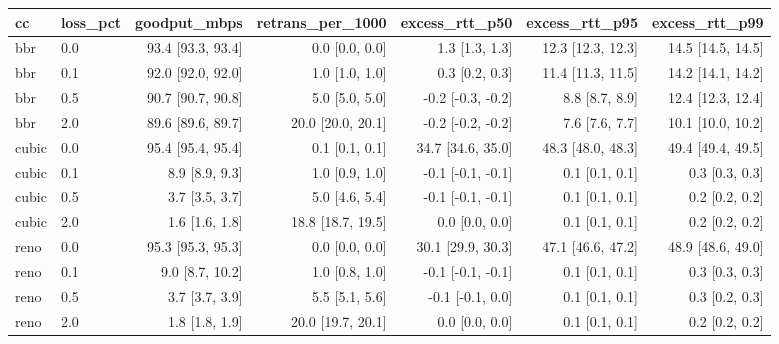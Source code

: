 \begin{tabular}{llrrrrr}
cc & loss_pct & goodput\_mbps & retrans\_per\_1000 & excess\_rtt\_p50 & excess\_rtt\_p95 & excess\_rtt\_p99 \\ \hline
bbr & 0.0 & 93.4 [93.3, 93.4] & 0.0 [0.0, 0.0] & 1.3 [1.3, 1.3] & 12.3 [12.3, 12.3] & 14.5 [14.5, 14.5] \\
bbr & 0.1 & 92.0 [92.0, 92.0] & 1.0 [1.0, 1.0] & 0.3 [0.2, 0.3] & 11.4 [11.3, 11.5] & 14.2 [14.1, 14.2] \\
bbr & 0.5 & 90.7 [90.7, 90.8] & 5.0 [5.0, 5.0] & -0.2 [-0.3, -0.2] & 8.8 [8.7, 8.9] & 12.4 [12.3, 12.4] \\
bbr & 2.0 & 89.6 [89.6, 89.7] & 20.0 [20.0, 20.1] & -0.2 [-0.2, -0.2] & 7.6 [7.6, 7.7] & 10.1 [10.0, 10.2] \\
cubic & 0.0 & 95.4 [95.4, 95.4] & 0.1 [0.1, 0.1] & 34.7 [34.6, 35.0] & 48.3 [48.0, 48.3] & 49.4 [49.4, 49.5] \\
cubic & 0.1 & 8.9 [8.9, 9.3] & 1.0 [0.9, 1.0] & -0.1 [-0.1, -0.1] & 0.1 [0.1, 0.1] & 0.3 [0.3, 0.3] \\
cubic & 0.5 & 3.7 [3.5, 3.7] & 5.0 [4.6, 5.4] & -0.1 [-0.1, -0.1] & 0.1 [0.1, 0.1] & 0.2 [0.2, 0.2] \\
cubic & 2.0 & 1.6 [1.6, 1.8] & 18.8 [18.7, 19.5] & 0.0 [0.0, 0.0] & 0.1 [0.1, 0.1] & 0.2 [0.2, 0.2] \\
reno & 0.0 & 95.3 [95.3, 95.3] & 0.0 [0.0, 0.0] & 30.1 [29.9, 30.3] & 47.1 [46.6, 47.2] & 48.9 [48.6, 49.0] \\
reno & 0.1 & 9.0 [8.7, 10.2] & 1.0 [0.8, 1.0] & -0.1 [-0.1, -0.1] & 0.1 [0.1, 0.1] & 0.3 [0.3, 0.3] \\
reno & 0.5 & 3.7 [3.7, 3.9] & 5.5 [5.1, 5.6] & -0.1 [-0.1, 0.0] & 0.1 [0.1, 0.1] & 0.3 [0.2, 0.3] \\
reno & 2.0 & 1.8 [1.8, 1.9] & 20.0 [19.7, 20.1] & 0.0 [0.0, 0.0] & 0.1 [0.1, 0.1] & 0.2 [0.2, 0.2] \\
\end{tabular}
